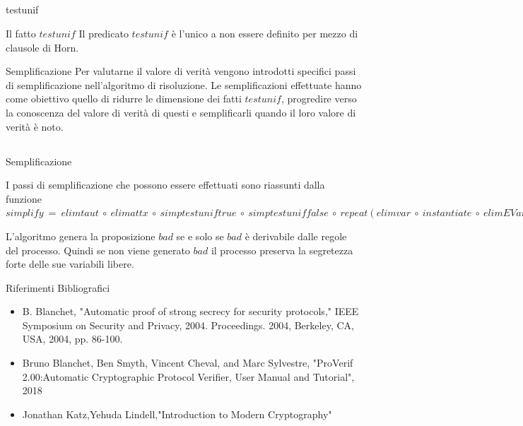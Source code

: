 \documentclass[11pt,xcolor=table]{beamer}
\begin{document}
\subsection{}
\begin{frame}{testunif}
    \begin{block}{Il fatto $testunif$}
        Il predicato $testunif$ è l'unico a non essere definito per mezzo di clausole di Horn.
    \end{block}
    
    \begin{block}{Semplificazione}
    Per valutarne il valore di verità vengono introdotti specifici passi di semplificazione nell'algoritmo di risoluzione. Le semplificazioni effettuate hanno come obiettivo quello di ridurre le dimensione dei fatti $testunif$, progredire verso la conoscenza del valore di verità di questi e semplificarli quando il loro valore di verità è noto.
    \end{block}
\end{frame}

\subsection{}
\begin{frame}{Semplificazione}
    \begin{block}{}
        I passi di semplificazione che possono essere effettuati sono riassunti dalla funzione 
            $simplify\ =\ elimtaut\ \circ \ elimattx\ \circ \ simptestuniftrue\ \circ \ simptestuniffalse\ \circ \ repeat(elimvar\ \circ \ instantiate\ \circ \ elimEVar\ \circ \ swap\ \circ \ unify) $
        
    \end{block}
    
    \begin{block}{}
        L'algoritmo genera la proposizione $bad$ se e solo se $bad$ è derivabile dalle regole del processo. Quindi se non viene generato $bad$ il processo preserva la segretezza forte delle sue variabili libere.
    \end{block}
\end{frame}

\begin{frame}{Riferimenti Bibliografici}
    \begin{itemize}
        \item B. Blanchet, "Automatic proof of strong secrecy for security protocols," IEEE Symposium on Security and Privacy, 2004. Proceedings. 2004, Berkeley, CA, USA, 2004, pp. 86-100.
        \item Bruno Blanchet, Ben Smyth, Vincent Cheval, and Marc Sylvestre, "ProVerif 2.00:Automatic Cryptographic Protocol Verifier, User Manual and Tutorial", 2018 
        \item Jonathan Katz,Yehuda Lindell,"Introduction to Modern Cryptography"
    \end{itemize}
\end{frame}
\end{document}
